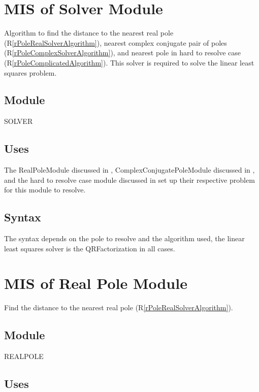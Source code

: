 \documentclass[12pt, titlepage]{article}
\newcommand{\rref}[1]{(R\ref{#1})}
\begin{document}
\section{MIS of Solver Module} \label{sc:MIS_SOLVER}

Algorithm to find the distance to the
 nearest real pole \rref{rPoleRealSolverAlgorithm},
 nearest complex conjugate pair of poles \rref{rPoleComplexSolverAlgorithm}, and
 nearest pole in hard to resolve case \rref{rPoleComplicatedAlgorithm}.
This solver is required to solve the linear least squares problem.

\subsection{Module}

SOLVER

\subsection{Uses}

The RealPoleModule discussed in ,
 ComplexConjugatePoleModule discussed in , and
 the hard to resolve case module discussed in 
 set up their respective problem for this module to resolve.

\subsection{Syntax}

The syntax depends on the pole to resolve and the algorithm used, the linear least squares
solver is the QRFactorization in all cases.

\section{MIS of Real Pole Module} \label{sc:MIS_POLEREALSOLVERMODULE}

Find the distance to the nearest real pole \rref{rPoleRealSolverAlgorithm}.

\subsection{Module}

REALPOLE

\subsection{Uses}
\end{document}
